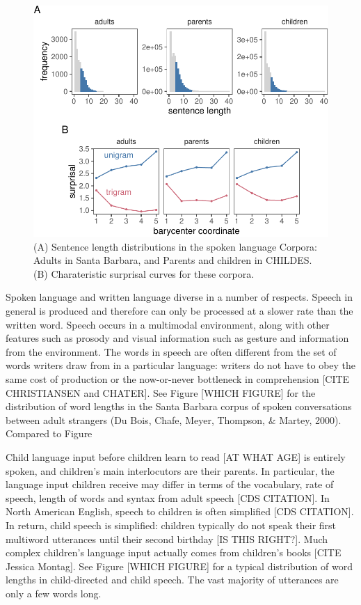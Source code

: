 \documentclass[10pt, letterpaper]{article}
\newenvironment{CodeChunk}{}{}
\begin{document}
\begin{CodeChunk}
\begin{figure}[tb]

{\centering \includegraphics{figs/spoken_figs-1} 

}

\caption[(A) Sentence length distributions in the spoken language Corpora]{(A) Sentence length distributions in the spoken language Corpora: Adults in Santa Barbara, and Parents and children in CHILDES. (B) Charateristic surprisal curves for these corpora.}\label{fig:spoken_figs}
\end{figure}
\end{CodeChunk}

Spoken language and written language diverse in a number of respects.
Speech in general is produced and therefore can only be processed at a
slower rate than the written word. Speech occurs in a multimodal
environment, along with other features such as prosody and visual
information such as gesture and information from the environment. The
words in speech are often different from the set of words writers draw
from in a particular language: writers do not have to obey the same cost
of production or the now-or-never bottleneck in comprehension {[}CITE
CHRISTIANSEN and CHATER{]}. See Figure {[}WHICH FIGURE{]} for the
distribution of word lengths in the Santa Barbara corpus of spoken
conversations between adult strangers (Du Bois, Chafe, Meyer, Thompson,
\& Martey, 2000). Compared to Figure

Child language input before children learn to read {[}AT WHAT AGE{]} is
entirely spoken, and children's main interlocutors are their parents. In
particular, the language input children receive may differ in terms of
the vocabulary, rate of speech, length of words and syntax from adult
speech {[}CDS CITATION{]}. In North American English, speech to children
is often simplified {[}CDS CITATION{]}. In return, child speech is
simplified: children typically do not speak their first multiword
utterances until their second birthday {[}IS THIS RIGHT?{]}. Much
complex children's language input actually comes from children's books
{[}CITE Jessica Montag{]}. See Figure {[}WHICH FIGURE{]} for a typical
distribution of word lengths in child-directed and child speech. The
vast majority of utterances are only a few words long.
\end{document}
